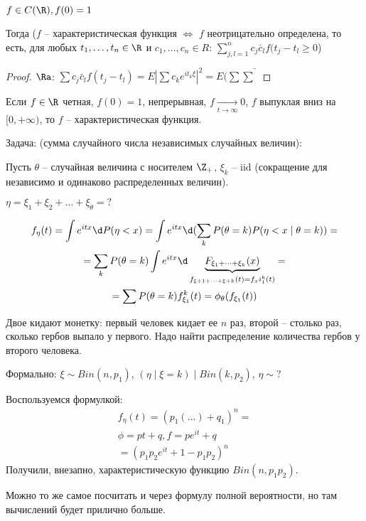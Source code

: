 \begin{theorem}
$f \in C(\R), f(0) = 1$

Тогда ($f$ -- характеристическая функция $\Leftrightarrow$ $f$ неотрицательно определена, то есть, для любых $t_1, \dots, t_n \in \R$ и $c_1, \dots, c_n \in R$: 
$\sum\limits_{j, l=1}^n c_j \bar c_l f(t_j - t_l \geq 0$)
\end{theorem}
\begin{proof}
$\Ra$: $\sum c_j \bar c_l f(t_j - t_l) = E | \sum c_ke^{it_k\xi} |^2 = E(\sum \bar\sum$ 
\end{proof}
\begin{theorem}[Пойа]
Если $f \in \R$ четная, $f(0) = 1$, непрерывная, $f \xrightarrow[t \to \infty]{} 0$, $f$ выпуклая вниз на $[0, +\infty)$, то $f$ -- характеристическая функция.
\end{theorem}

Задача: (сумма случайного числа независимых случайных величин):

Пусть $\theta$ -- случайная величина с носителем $\Z_+$, $\xi_k$ -- iid (сокращение для независимо и одинаково распределенных величин).

$\eta = \xi_1 + \xi_2 + \dots + \xi_\theta = ?$

\begin{gather*}
f_\eta(t) = \int e^{itx}\d P(\eta < x) = \int e^{itx} \d (\sum\limits_k P(\theta = k) P(\eta < x \mid \theta = k)) =\\
= \sum\limits_k P(\theta =  k) \int e^{itx} \d \underbrace{F_{\xi_1 + \dots +  \xi_k}(x)}_{f_{\xi+1 + \dots + \xi+k}(t) = f_xi_1^k(t)} = \\
= \sum P(\theta = k) f_{\xi_1}^k(t) = \phi_\theta(f_{\xi_1}(t))
\end{gather*}

\begin{exmp}
Двое кидают монетку: первый человек кидает ее $n$ раз, второй -- столько раз, сколько гербов выпало у первого. 
Надо найти распределение количества гербов у второго человека.

Формально: $\xi \sim Bin(n, p_1)$, $(\eta \mid \xi = k) \mid Bin(k, p_2)$, $\eta \sim ?$

Воспользуемся формулкой:
\begin{gather*}
f_\eta(t)  = (p_1( \dots ) + q_1)^n = \\
\phi = pt + q, f = pe^{it} + q \\
= (p_1p_2e^{it} + 1-p_1p_2)^n
\end{gather*}
Получили, внезапно, характеристическую функцию $Bin(n, p_1p_2)$.

Можно то же самое посчитать и через формулу полной вероятности, но там вычислений будет прилично больше.
\end{exmp}

